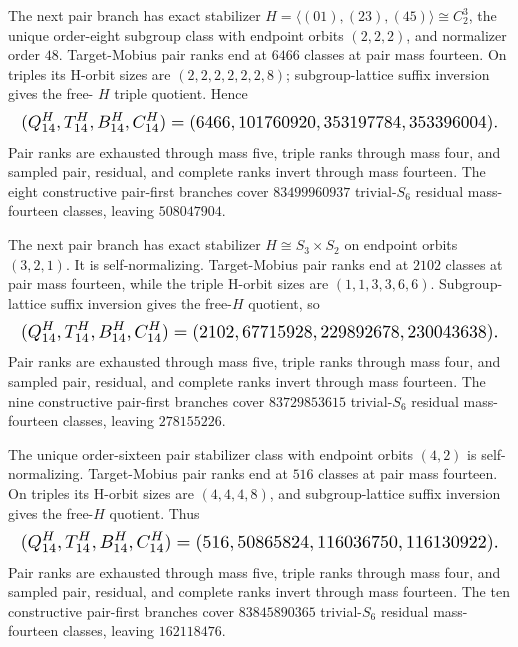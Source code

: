 \documentclass{article}
\newcommand{\fitmath}[1]{\resizebox{0.99\linewidth}{!}{$\displaystyle #1$}}
\begin{document}
The next pair branch has exact stabilizer
$H=\langle(01),(23),(45)\rangle\cong C_2^3$, the unique order-eight subgroup
class with endpoint orbits $(2,2,2)$, and normalizer order $48$. Target-Mobius
pair ranks end at $6466$ classes at pair mass fourteen. On triples its H-orbit
sizes are $(2,2,2,2,2,2,8)$; subgroup-lattice suffix inversion gives the free-
$H$ triple quotient. Hence
\begin{equation}
  \fitmath{%
    (Q^H_{14},T^H_{14},B^H_{14},C^H_{14})
      =(6466,101760920,353197784,353396004).
  }
  \label{eq:optimization-crazy-sextuple-s6-pair-c2-cubed-ranking}
\end{equation}
Pair ranks are exhausted through mass five, triple ranks through mass four, and
sampled pair, residual, and complete ranks invert through mass fourteen. The
eight constructive pair-first branches cover $83499960937$ trivial-$S_6$
residual mass-fourteen classes, leaving $508047904$.

The next pair branch has exact stabilizer $H\cong S_3\times S_2$ on endpoint
orbits $(3,2,1)$. It is self-normalizing. Target-Mobius pair ranks end at $2102$
classes at pair mass fourteen, while the triple H-orbit sizes are
$(1,1,3,3,6,6)$. Subgroup-lattice suffix inversion gives the free-$H$ quotient,
so
\begin{equation}
  \fitmath{%
    (Q^H_{14},T^H_{14},B^H_{14},C^H_{14})
      =(2102,67715928,229892678,230043638).
  }
  \label{eq:optimization-crazy-sextuple-s6-pair-s3-times-s2-ranking}
\end{equation}
Pair ranks are exhausted through mass five, triple ranks through mass four, and
sampled pair, residual, and complete ranks invert through mass fourteen. The
nine constructive pair-first branches cover $83729853615$ trivial-$S_6$
residual mass-fourteen classes, leaving $278155226$.

The unique order-sixteen pair stabilizer class with endpoint orbits $(4,2)$ is
self-normalizing. Target-Mobius pair ranks end at $516$ classes at pair mass
fourteen. On triples its H-orbit sizes are $(4,4,4,8)$, and subgroup-lattice
suffix inversion gives the free-$H$ quotient. Thus
\begin{equation}
  \fitmath{%
    (Q^H_{14},T^H_{14},B^H_{14},C^H_{14})
      =(516,50865824,116036750,116130922).
  }
  \label{eq:optimization-crazy-sextuple-s6-pair-order16-42-ranking}
\end{equation}
Pair ranks are exhausted through mass five, triple ranks through mass four, and
sampled pair, residual, and complete ranks invert through mass fourteen. The ten
constructive pair-first branches cover $83845890365$ trivial-$S_6$ residual
mass-fourteen classes, leaving $162118476$.
\end{document}
